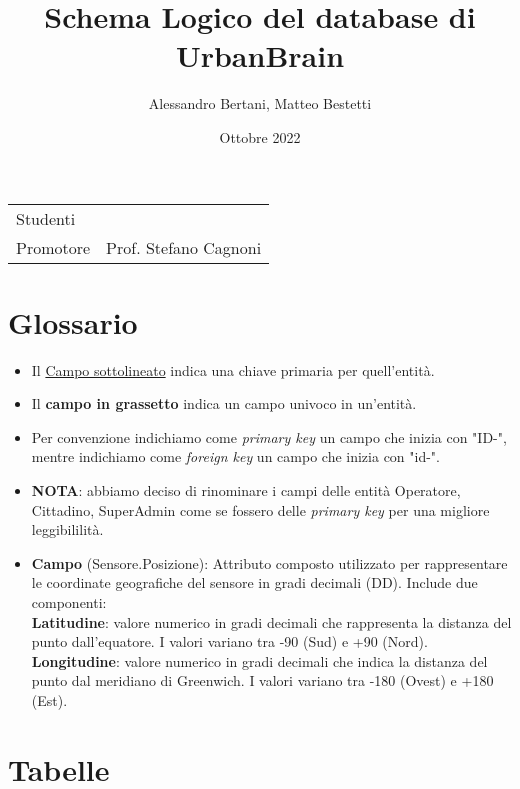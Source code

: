\documentclass{article}
\title{Schema Logico del database di UrbanBrain}
\author{Alessandro Bertani, Matteo Bestetti}
\date{Ottobre 2022}
\newcommand{\book}{\textcolor{light_blue}{\faBook}}
\newcommand{\pin}{\textcolor{map_red}{\faMapMarker}}
\begin{document}
	
	\maketitle
	
	\noindent\begin{tabular}{@{}ll}
		Studenti & \theauthor\\
		Promotore &  Prof. Stefano Cagnoni\\
	\end{tabular}
	\section*{Glossario}
	\small %
	
	\begin{itemize}
		\item[\book] Il \underline{Campo sottolineato} indica una chiave primaria per quell'entità.
		\item[\book] Il \textbf{campo in grassetto} indica un campo univoco in un'entità.
		\item[\book] Per convenzione indichiamo come \textit{primary key} un campo che inizia con "ID-", mentre indichiamo come \textit{foreign key} un campo che inizia con "id-".
		\item[\faEdit] \textbf{NOTA}: abbiamo deciso di rinominare i campi delle entità Operatore, Cittadino, SuperAdmin come se fossero delle \textit{primary key} per una migliore leggibililità.
		\item[\textcolor{map_green}{\faMap}] \textbf{Campo} (Sensore.Posizione): Attributo composto utilizzato per rappresentare le coordinate geografiche del sensore in gradi decimali (DD). Include due componenti:\\
		\pin\space \textbf{Latitudine}: valore numerico in gradi decimali che rappresenta la distanza del punto dall'equatore. I valori variano tra -90 (Sud) e +90 (Nord). \\
		\pin\space \textbf{Longitudine}: valore numerico in gradi decimali che indica la distanza del punto dal meridiano di Greenwich. I valori variano tra -180 (Ovest) e +180 (Est).
	\end{itemize}
	
	\section*{Tabelle}
	\small %
	
\end{document}
